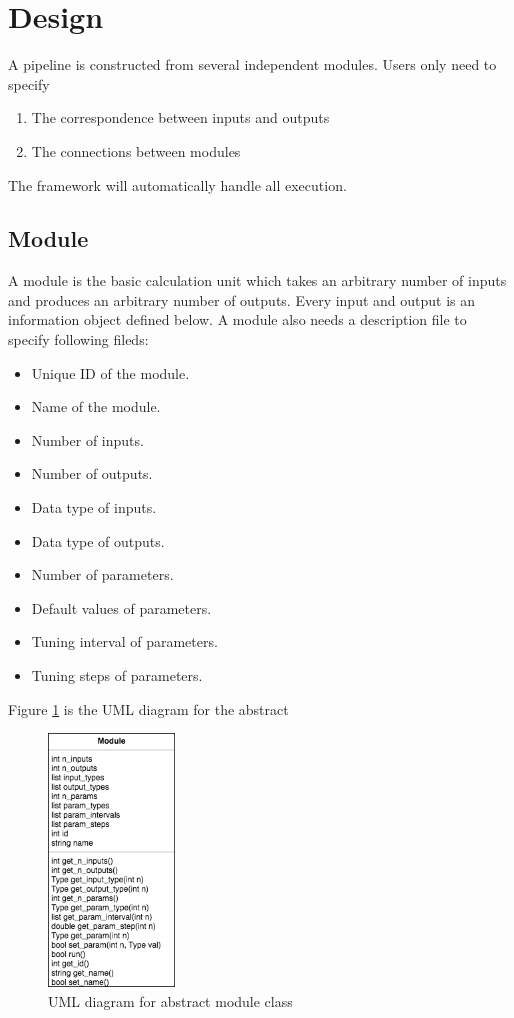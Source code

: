 \documentclass{article}
\begin{document}
\section{Design}
    A pipeline is constructed from several independent modules.
    Users only need to specify
    \begin{enumerate}
        \item The correspondence between inputs and outputs
        \item The connections between modules
    \end{enumerate}
    The framework will automatically handle all execution.

    \subsection{Module}
    A module is the basic calculation unit which takes an arbitrary number of inputs and produces an arbitrary number of outputs.
    Every input and output is an information object defined below.
    A module also needs a description file to specify following fileds:
    \begin{itemize}
        \item Unique ID of the module.
        \item Name of the module.
        \item Number of inputs.
        \item Number of outputs.
        \item Data type of inputs.
        \item Data type of outputs.
        \item Number of parameters.
        \item Default values of parameters.
        \item Tuning interval of parameters.
        \item Tuning steps of parameters.
    \end{itemize}

    Figure \ref{fig:module_uml} is the UML diagram for the abstract
    \begin{figure}[H]
        \begin{center}
            \includegraphics[width=0.3\textwidth]{fig/module_uml.png}
        \end{center}
        \label{fig:module_uml}
        \caption{UML diagram for abstract module class}
    \end{figure}
\end{document}

